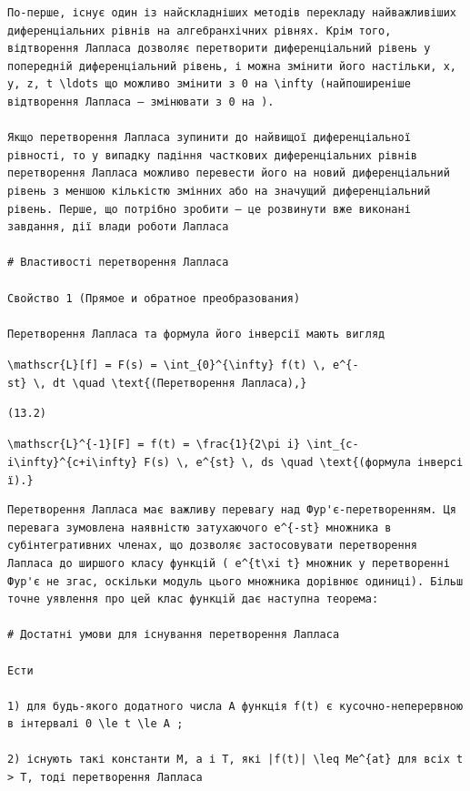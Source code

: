 \documentclass[
  ukrainian,
]{article}
\begin{document}
\begin{verbatim}
По-перше, існує один із найскладніших методів перекладу найважливіших диференціальних рівнів на алгебранхічних рівнях. Крім того, відтворення Лапласа дозволяє перетворити диференціальний рівень у попередній диференціальний рівень, і можна змінити його настільки, x, y, z, t \ldots що можливо змінити з 0 на \infty (найпоширеніше відтворення Лапласа — змінювати з 0 на ).

Якщо перетворення Лапласа зупинити до найвищої диференціальної рівності, то у випадку падіння часткових диференціальних рівнів перетворення Лапласа можливо перевести його на новий диференціальний рівень з меншою кількістю змінних або на значущий диференціальний рівень. Перше, що потрібно зробити — це розвинути вже виконані завдання, дії влади роботи Лапласа

# Властивості перетворення Лапласа

Свойство 1 (Прямое и обратное преобразования)

Перетворення Лапласа та формула його інверсії мають вигляд
\end{verbatim}

\texttt{\textbackslash{}mathscr\{L\}{[}f{]}\ =\ F(s)\ =\ \textbackslash{}int\_\{0\}\^{}\{\textbackslash{}infty\}\ f(t)\ \textbackslash{},\ e\^{}\{-st\}\ \textbackslash{},\ dt\ \textbackslash{}quad\ \textbackslash{}text\{(Перетворення\ Лапласа),\}}

\begin{verbatim}
(13.2)
\end{verbatim}

\texttt{\textbackslash{}mathscr\{L\}\^{}\{-1\}{[}F{]}\ =\ f(t)\ =\ \textbackslash{}frac\{1\}\{2\textbackslash{}pi\ i\}\ \textbackslash{}int\_\{c-i\textbackslash{}infty\}\^{}\{c+i\textbackslash{}infty\}\ F(s)\ \textbackslash{},\ e\^{}\{st\}\ \textbackslash{},\ ds\ \textbackslash{}quad\ \textbackslash{}text\{(формула\ інверсії).\}}

\begin{verbatim}
Перетворення Лапласа має важливу перевагу над Фур'є-перетворенням. Ця перевага зумовлена наявністю затухаючого e^{-st} множника в субінтегративних членах, що дозволяє застосовувати перетворення Лапласа до ширшого класу функцій ( e^{t\xi t} множник у перетворенні Фур'є не згас, оскільки модуль цього множника дорівнює одиниці). Більш точне уявлення про цей клас функцій дає наступна теорема:

# Достатні умови для існування перетворення Лапласа

Ести

1) для будь-якого додатного числа A функція f(t) є кусочно-неперервною в інтервалі 0 \le t \le A ;

2) існують такі константи M, a і T, які |f(t)| \leq Me^{at} для всіх t > T, тоді перетворення Лапласа
\end{verbatim}
\end{document}
